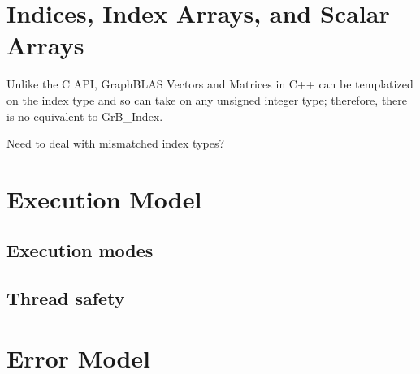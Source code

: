 \section{Indices, Index Arrays, and Scalar Arrays}

Unlike the C API, GraphBLAS Vectors and Matrices in C++ can be templatized on
the index type and so can take on any unsigned integer type; therefore, there is
no equivalent to GrB\_Index.

Need to deal with mismatched index types?

\section{Execution Model}

\subsection{Execution modes}

\subsection{Thread safety}
\label{Sec:ThreadSafety}


\section{Error Model}
\label{Sec:ErrorModel}
